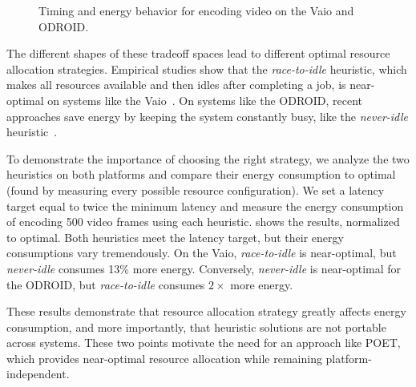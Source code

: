 \begin{figure}[t]
  \centering
  \caption{Timing and energy behavior for encoding video on the Vaio and ODROID.}
  \label{fig:poet-x264-motivation}
\end{figure}

The different shapes of these tradeoff spaces lead to different optimal resource allocation strategies.
Empirical studies show that the \emph{race-to-idle} heuristic, which makes all resources available and then idles after completing a job, is near-optimal on systems like the Vaio~\cite{google,Hoelzle2009,HotPower,Imes2014,PowerSlope}.
On systems like the ODROID, recent approaches save energy by keeping the system constantly busy, like the \emph{never-idle} heuristic~\cite{Carroll13,HotPower,Imes2014,LeSueur11,Lin2010}.

To demonstrate the importance of choosing the right strategy, we analyze the two heuristics on both platforms and compare their energy consumption to optimal (found by measuring every possible resource configuration).
We set a latency target equal to twice the minimum latency and measure the energy consumption of encoding 500 video frames using each heuristic.
 shows the results, normalized to optimal.
Both heuristics meet the latency target, but their energy consumptions vary tremendously.
On the Vaio, \emph{race-to-idle} is near-optimal, but \emph{never-idle} consumes 13\% more energy.
Conversely, \emph{never-idle} is near-optimal for the ODROID, but \emph{race-to-idle} consumes $2 \times$ more energy.

These results demonstrate that resource allocation strategy greatly affects energy consumption, and more importantly, that heuristic solutions are not portable across systems.
These two points motivate the need for an approach like POET, which provides near-optimal resource allocation while remaining platform-independent.
